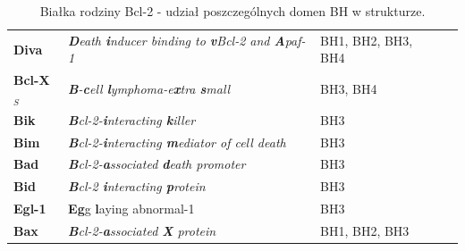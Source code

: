 \begin{table}[!ht]
\begin{tabular}{lp{6.1cm}p{3.9cm}r}
\rule[-2ex]{0pt}{5.5ex}	\textbf{Diva} & \textit{\textbf{D}eath \textbf{i}nducer binding to \textbf{v}Bcl-2 and \textbf{A}paf-1}\nomenclature{Diva}{ang. \textit{\textbf{D}eath \textbf{i}nducer binding to \textbf{v}Bcl-2 and \textbf{A}paf-1}} & BH1, BH2, BH3, BH4 & \cite{Inohara1998}\\
\rule[-2ex]{0pt}{5.5ex}	\textbf{Bcl-X$_S$} & \textit{\textbf{B}-\textbf{c}ell \textbf{l}ymphoma-e\textbf{x}tra \textbf{s}mall} \nomenclature{Bcl-X$_S$}{ang. \textit{\textbf{B}-\textbf{c}ell \textbf{l}ymphoma-e\textbf{x}tra \textbf{s}mall}}& BH3, BH4 & \cite{Ban1998,Chang1999} \\
\rule[-2ex]{0pt}{5.5ex}	\textbf{Bik} & \textit{\textbf{B}cl-2-\textbf{i}nteracting \textbf{k}iller}\nomenclature{Bik}{ang. \textit{\textbf{B}cl-2-\textbf{i}nteracting \textbf{k}iller}} & BH3 & \cite{Dunham1999}\\
\rule[-2ex]{0pt}{5.5ex}	\textbf{Bim} & \textit{\textbf{B}cl-2-\textbf{i}nteracting \textbf{m}ediator of cell death}\nomenclature{Bim}{ang. \textit{\textbf{B}cl-2-\textbf{i}nteracting \textbf{m}ediator of cell death}} & BH3 & \cite{Gogada2013,O'Connor1998}\\
\rule[-2ex]{0pt}{5.5ex}	\textbf{Bad} & \textit{\textbf{B}cl-2-\textbf{a}ssociated \textbf{d}eath promoter}\nomenclature{Bad}{ang. \textit{\textbf{B}cl-2-\textbf{a}ssociated \textbf{d}eath promoter}} & BH3 & \cite{Adachi2002} \\
\rule[-2ex]{0pt}{5.5ex}	\textbf{Bid} & \textit{\textbf{B}cl-2 \textbf{i}nteracting \textbf{p}rotein}\nomenclature{Bid}{ang. \textit{\textbf{B}cl2 \textbf{i}nteracting \textbf{p}rotein}} & BH3 & \cite{Luo1998} \\
\rule[-2ex]{0pt}{5.5ex}	\textbf{Egl-1} & \textbf{Eg}g \textbf{l}aying abnormal-1\nomenclature{Egl-1}{ang. \textit{\textbf{Eg}g \textbf{l}aying abnormal-1}} & BH3 & \cite{Conradt1998} \\
\rule[-2ex]{0pt}{5.5ex}	\textbf{Bax} & \textit{\textbf{B}cl-2-\textbf{a}ssociated \textbf{X} protein}\nomenclature{Bax}{białka powiązane z Bcl-2 (ang. \textit{\textbf{B}cl-2-\textbf{a}ssociated \textbf{X} protein})} & BH1, BH2, BH3 & \cite{Czabotar2009,Yao2014} \\ \bottomrule[0.12em]
\end{tabular}
\caption[Białka rodziny Bcl-2]{Białka rodziny Bcl-2 - udział poszczególnych domen BH w strukturze.}
\label{tab:bcl}
\end{table}



